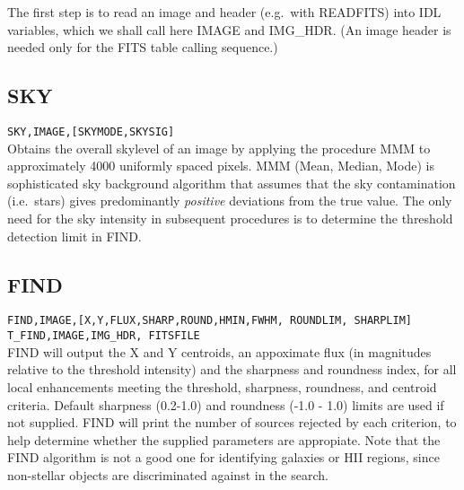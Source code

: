 The first step is to read an image and header (e.g.\ with READFITS)
into IDL variables, which we shall call here IMAGE and IMG\_HDR.  
(An image header is needed only for the FITS table calling sequence.)
\subsection{SKY}
{\tt SKY,IMAGE,[SKYMODE,SKYSIG]} \\

Obtains the overall skylevel of an image by applying the procedure MMM
to approximately 4000 uniformly spaced pixels.  MMM (Mean, Median, Mode)
is sophisticated sky background algorithm that assumes that the sky 
contamination (i.e.\ stars) gives predominantly {\em positive} deviations
from the true value.
The only need for the sky intensity in subsequent 
procedures is to 
determine the threshold detection limit in FIND.
\subsection{FIND}
{\tt FIND,IMAGE,[X,Y,FLUX,SHARP,ROUND,HMIN,FWHM, ROUNDLIM, SHARPLIM]} \\
{\tt T\_FIND,IMAGE,IMG\_HDR, FITSFILE}  \\ 
   
FIND will output the X and Y centroids, an appoximate flux (in magnitudes
relative to the threshold intensity)
and the sharpness and roundness index, for all local enhancements meeting
the threshold, sharpness, roundness, and centroid criteria.  Default
sharpness (0.2-1.0) and roundness (-1.0 - 1.0) limits are used if not
supplied.  FIND will print the number of sources rejected by each criterion,
to help determine whether the supplied parameters are appropiate. 
Note that the FIND algorithm is not a good one for identifying galaxies
or HII regions, since non-stellar objects are discriminated against in the
search.
           
